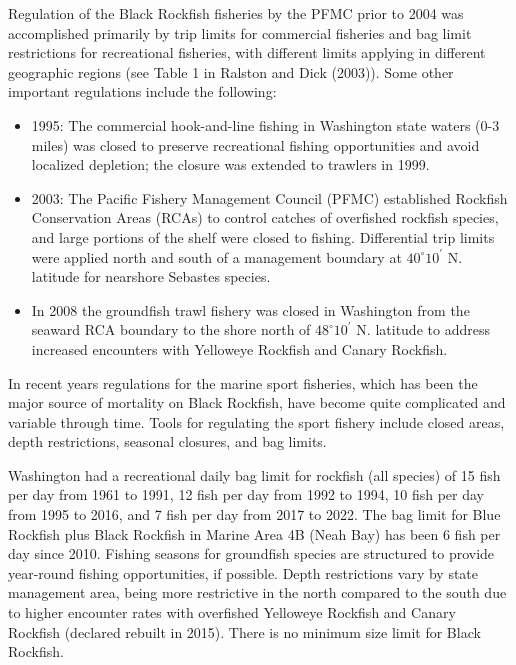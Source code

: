 \documentclass[11pt,
  english,
  letterpaper,
]{article}
\providecommand{\tightlist}{%
  \setlength{\itemsep}{0pt}\setlength{\parskip}{0pt}}
\providecommand{\tightlist}{%
  \setlength{\itemsep}{0pt}\setlength{\parskip}{0pt}}
\begin{document}
Regulation of the Black Rockfish fisheries by the PFMC prior to 2004 was accomplished primarily by trip limits for commercial fisheries and bag limit restrictions for recreational fisheries, with different limits applying in different geographic regions (see Table 1 in Ralston and Dick (2003)). Some other important regulations include the following:

\begin{itemize}
\tightlist
\item
  1995: The commercial hook-and-line fishing in Washington state waters (0-3 miles) was closed to preserve recreational fishing opportunities and avoid localized depletion; the closure was extended to trawlers in 1999.\\
\item
  2003: The Pacific Fishery Management Council (PFMC) established Rockfish Conservation Areas (RCAs) to control catches of overfished rockfish species, and large portions of the shelf were closed to fishing. Differential trip limits were applied north and south of a management boundary at \(40^\circ 10^\prime\) N. latitude for nearshore Sebastes species.
\item
  In 2008 the groundfish trawl fishery was closed in Washington from the seaward RCA boundary to the shore north of \(48^\circ 10^\prime\) N. latitude to address increased encounters with Yelloweye Rockfish and Canary Rockfish.
\end{itemize}

In recent years regulations for the marine sport fisheries, which has been the major source of mortality on Black Rockfish, have become quite complicated and variable through time. Tools for regulating the sport fishery include closed areas, depth restrictions, seasonal closures, and bag limits.

Washington had a recreational daily bag limit for rockfish (all species) of 15 fish per day from 1961 to 1991, 12 fish per day from 1992 to 1994, 10 fish per day from 1995 to 2016, and 7 fish per day from 2017 to 2022. The bag limit for Blue Rockfish plus Black Rockfish in Marine Area 4B (Neah Bay) has been 6 fish per day since 2010. Fishing seasons for groundfish species are structured to provide year-round fishing opportunities, if possible. Depth restrictions vary by state management area, being more restrictive in the north compared to the south due to higher encounter rates with overfished Yelloweye Rockfish and Canary Rockfish (declared rebuilt in 2015). There is no minimum size limit for Black Rockfish.
\end{document}
